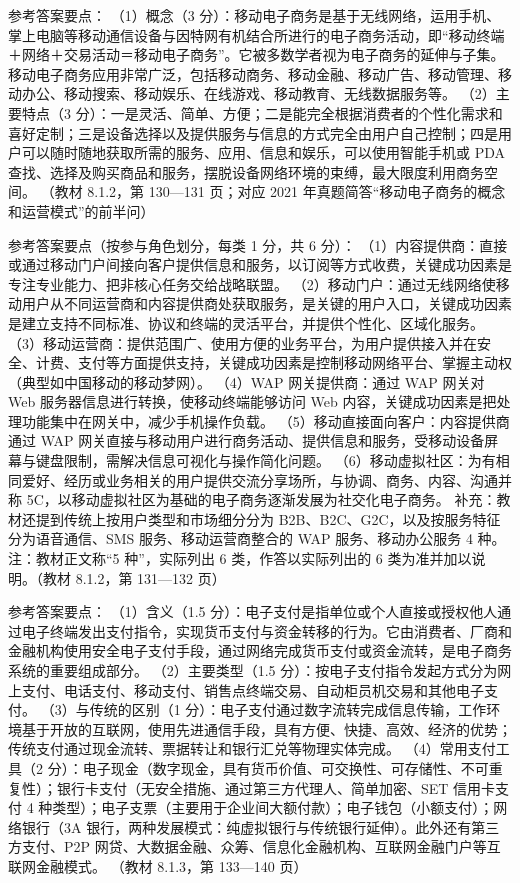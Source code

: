 \documentclass[a4paper,11pt]{article}
\begin{document}

\q 参考答案要点：
（1）概念（3 分）：移动电子商务是基于无线网络，运用手机、掌上电脑等移动通信设备与因特网有机结合所进行的电子商务活动，即“移动终端＋网络＋交易活动＝移动电子商务”。它被多数学者视为电子商务的延伸与子集。移动电子商务应用非常广泛，包括移动商务、移动金融、移动广告、移动管理、移动办公、移动搜索、移动娱乐、在线游戏、移动教育、无线数据服务等。
（2）主要特点（3 分）：一是灵活、简单、方便；二是能完全根据消费者的个性化需求和喜好定制；三是设备选择以及提供服务与信息的方式完全由用户自己控制；四是用户可以随时随地获取所需的服务、应用、信息和娱乐，可以使用智能手机或 PDA 查找、选择及购买商品和服务，摆脱设备网络环境的束缚，最大限度利用商务空间。
（教材 8.1.2，第 130—131 页；对应 2021 年真题简答“移动电子商务的概念和运营模式”的前半问）

\q 参考答案要点（按参与角色划分，每类 1 分，共 6 分）：
（1）内容提供商：直接或通过移动门户间接向客户提供信息和服务，以订阅等方式收费，关键成功因素是专注专业能力、把非核心任务交给战略联盟。
（2）移动门户：通过无线网络使移动用户从不同运营商和内容提供商处获取服务，是关键的用户入口，关键成功因素是建立支持不同标准、协议和终端的灵活平台，并提供个性化、区域化服务。
（3）移动运营商：提供范围广、使用方便的业务平台，为用户提供接入并在安全、计费、支付等方面提供支持，关键成功因素是控制移动网络平台、掌握主动权（典型如中国移动的移动梦网）。
（4）WAP 网关提供商：通过 WAP 网关对 Web 服务器信息进行转换，使移动终端能够访问 Web 内容，关键成功因素是把处理功能集中在网关中，减少手机操作负载。
（5）移动直接面向客户：内容提供商通过 WAP 网关直接与移动用户进行商务活动、提供信息和服务，受移动设备屏幕与键盘限制，需解决信息可视化与操作简化问题。
（6）移动虚拟社区：为有相同爱好、经历或业务相关的用户提供交流分享场所，与协调、商务、内容、沟通并称 5C，以移动虚拟社区为基础的电子商务逐渐发展为社交化电子商务。
补充：教材还提到传统上按用户类型和市场细分分为 B2B、B2C、G2C，以及按服务特征分为语音通信、SMS 服务、移动运营商整合的 WAP 服务、移动办公服务 4 种。注：教材正文称“5 种”，实际列出 6 类，作答以实际列出的 6 类为准并加以说明。（教材 8.1.2，第 131—132 页）

\q 参考答案要点：
（1）含义（1.5 分）：电子支付是指单位或个人直接或授权他人通过电子终端发出支付指令，实现货币支付与资金转移的行为。它由消费者、厂商和金融机构使用安全电子支付手段，通过网络完成货币支付或资金流转，是电子商务系统的重要组成部分。
（2）主要类型（1.5 分）：按电子支付指令发起方式分为网上支付、电话支付、移动支付、销售点终端交易、自动柜员机交易和其他电子支付。
（3）与传统的区别（1 分）：电子支付通过数字流转完成信息传输，工作环境基于开放的互联网，使用先进通信手段，具有方便、快捷、高效、经济的优势；传统支付通过现金流转、票据转让和银行汇兑等物理实体完成。
（4）常用支付工具（2 分）：电子现金（数字现金，具有货币价值、可交换性、可存储性、不可重复性）；银行卡支付（无安全措施、通过第三方代理人、简单加密、SET 信用卡支付 4 种类型）；电子支票（主要用于企业间大额付款）；电子钱包（小额支付）；网络银行（3A 银行，两种发展模式：纯虚拟银行与传统银行延伸）。此外还有第三方支付、P2P 网贷、大数据金融、众筹、信息化金融机构、互联网金融门户等互联网金融模式。
（教材 8.1.3，第 133—140 页）
\end{document}

